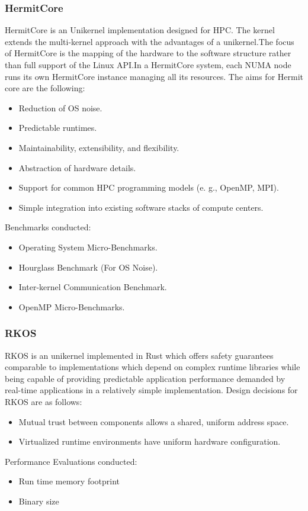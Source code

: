 \subsubsection{HermitCore}
HermitCore is an Unikernel implementation designed for HPC. The kernel extends the
multi-kernel approach with the advantages of a unikernel.The focus of HermitCore is 
the mapping of the hardware to
the software structure rather than full support of the Linux
API.In a HermitCore system, each NUMA node runs its own HermitCore instance managing all its resources.
The aims for Hermit core are the following:
\begin{itemize}
  \item Reduction of OS noise.
  \item Predictable runtimes.
  \item Maintainability, extensibility, and flexibility.
  \item Abstraction of hardware details.
  \item Support for common HPC programming models (e. g.,
  OpenMP, MPI).
  \item Simple integration into existing software stacks of
  compute centers.
\end{itemize}
Benchmarks conducted:
\begin{itemize}
  \item Operating System Micro-Benchmarks.
  \item Hourglass Benchmark (For OS Noise).
  \item Inter-kernel Communication Benchmark.
  \item OpenMP Micro-Benchmarks.
\end{itemize}

\subsubsection{RKOS}
RKOS is an unikernel implemented in Rust which
offers safety guarantees comparable to implementations which depend on complex runtime
libraries while being capable of providing predictable application performance demanded
by real-time applications in a relatively simple implementation. 
Design decisions for RKOS are as follows:
\begin{itemize}
  \item Mutual trust between components allows a shared, uniform address space.
  \item Virtualized runtime environments have uniform hardware configuration.
\end{itemize}
Performance Evaluations conducted:
\begin{itemize}
  \item Run time memory footprint 
  \item Binary size 
\end{itemize}

